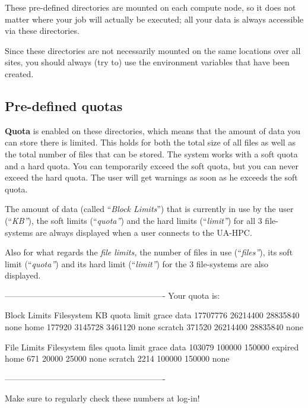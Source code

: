 These pre-defined directories are mounted on each compute node, so it does not matter where your job will actually be executed; all your data is always accessible via these directories.

Since these directories are not necessarily mounted on the same locations over all sites, you should always (try to) use the environment variables that have been created.

\subsection{Pre-defined quotas}

\textbf{Quota} is enabled on these directories, which means that the amount of data you can store there is limited. This holds for both the total size of all files as well as the total number of files that can be stored. The system works with a soft quota and a hard quota. You can temporarily exceed the soft quota, but you can never exceed the hard quota. The user will get warnings as soon as he exceeds the soft quota.

The amount of data (called ``\textit{Block Limits}'') that is currently in use by the user (``\textit{KB''}), the soft limits (``\textit{quota''}) and the hard limits (``\textit{limit''}) for all 3 file-systems are always displayed when a user connects to the UA-HPC.

 Also for what regards the \textit{file limits,} the number of files in use (``\textit{files''}), its soft limit (``\textit{quota''}) and its hard limit (``\textit{limit''}) for the 3 file-systems are also displayed.

\begin{prompt}
----------------------------------------------------------
Your quota is:

                   Block Limits
   Filesystem         KB      quota      limit    grace
   data         17707776   26214400   28835840     none
   home           177920    3145728    3461120     none
   scratch        371520   26214400   28835840     none

                File Limits
   Filesystem      files      quota      limit    grace
   data           103079     100000     150000  expired
   home              671      20000      25000     none
   scratch          2214     100000     150000     none

----------------------------------------------------------
\end{prompt}
Make sure to regularly check these numbers at log-in!

